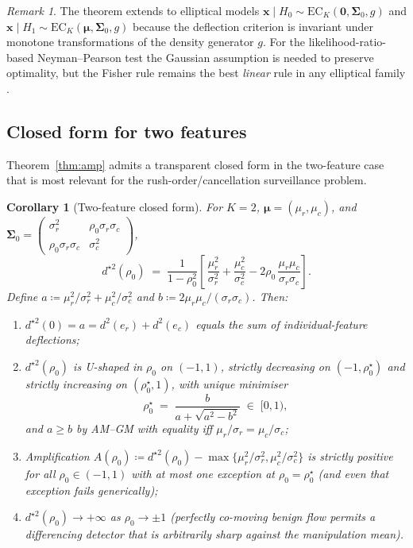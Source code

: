 \documentclass[11pt,a4paper]{article}
\newtheorem{corollary}[theorem]{Corollary}
\theoremstyle{definition}
\theoremstyle{remark}
\newtheorem*{remark}{Remark}
\newcommand{\1}{\mathbf{1}}
\newcommand{\x}{\mathbf{x}}
\newcommand{\mmu}{\boldsymbol{\mu}}
\newcommand{\Sig}{\boldsymbol{\Sigma}}
\newcommand{\defeq}{\coloneqq}
\begin{document}
\begin{remark}
\label{rem:non-gauss}
The theorem extends to elliptical models $\x\mid H_0\sim\mathrm{EC}_K(\mathbf{0},\Sig_0, g)$ and $\x\mid H_1\sim\mathrm{EC}_K(\mmu,\Sig_0,g)$ because the deflection criterion is invariant under monotone transformations of the density generator $g$. For the likelihood-ratio-based Neyman--Pearson test the Gaussian assumption is needed to preserve optimality, but the Fisher rule remains the best \emph{linear} rule in any elliptical family \citep[Ch.~6]{poor1994introduction}.
\end{remark}

\subsection{Closed form for two features}
Theorem~\ref{thm:amp} admits a transparent closed form in the two-feature case that is most relevant for the rush-order/cancellation surveillance problem.

\begin{corollary}[Two-feature closed form]
\label{cor:2d}
For $K=2$, $\mmu=(\mu_r,\mu_c)$, and $\Sig_0=\begin{pmatrix}\sigma_r^2 & \rho_0\sigma_r\sigma_c\\ \rho_0\sigma_r\sigma_c & \sigma_c^2\end{pmatrix}$,
\begin{equation}
d^{\star 2}(\rho_0) \;=\; \frac{1}{1-\rho_0^2}\left[\,\frac{\mu_r^2}{\sigma_r^2} + \frac{\mu_c^2}{\sigma_c^2} - 2\rho_0\,\frac{\mu_r\mu_c}{\sigma_r\sigma_c}\right].
\label{eq:2d}
\end{equation}
Define $a\defeq \mu_r^2/\sigma_r^2+\mu_c^2/\sigma_c^2$ and $b\defeq 2\mu_r\mu_c/(\sigma_r\sigma_c)$. Then:
\begin{enumerate}
\item[(i)] $d^{\star 2}(0)=a=d^2(e_r)+d^2(e_c)$ equals the sum of individual-feature deflections;
\item[(ii)] $d^{\star 2}(\rho_0)$ is U-shaped in $\rho_0$ on $(-1,1)$, strictly decreasing on $(-1,\rho_0^\star)$ and strictly increasing on $(\rho_0^\star,1)$, with unique minimiser
\begin{equation}
\rho_0^\star \;=\; \frac{b}{a+\sqrt{a^2-b^2}} \;\in\;[0,1),
\label{eq:rhostar}
\end{equation}
and $a\ge b$ by AM--GM with equality iff $\mu_r/\sigma_r=\mu_c/\sigma_c$;
\item[(iii)] Amplification $A(\rho_0)\defeq d^{\star 2}(\rho_0) - \max\{\mu_r^2/\sigma_r^2,\mu_c^2/\sigma_c^2\}$ is strictly positive for all $\rho_0\in(-1,1)$ with at most one exception at $\rho_0=\rho_0^\star$ (and even that exception fails generically);
\item[(iv)] $d^{\star 2}(\rho_0)\to+\infty$ as $\rho_0\to\pm 1$ (perfectly co-moving benign flow permits a differencing detector that is arbitrarily sharp against the manipulation mean).
\end{enumerate}
\end{corollary}
\end{document}
